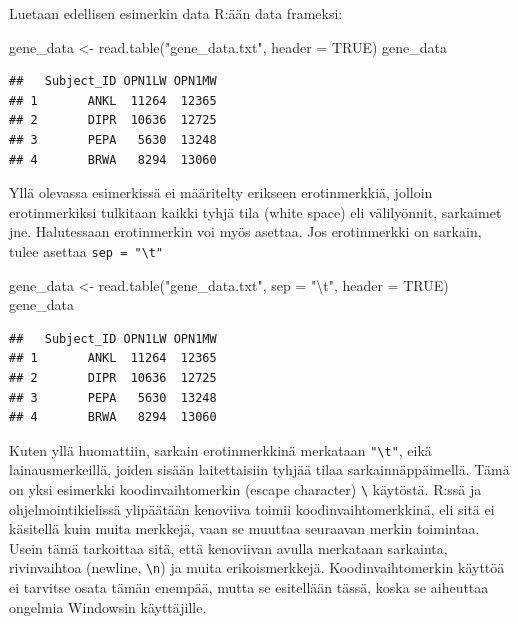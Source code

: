 \documentclass[
]{book}
\newenvironment{Shaded}{\begin{snugshade}}{\end{snugshade}}
\newcommand{\AttributeTok}[1]{\textcolor[rgb]{0.77,0.63,0.00}{#1}}
\newcommand{\ConstantTok}[1]{\textcolor[rgb]{0.00,0.00,0.00}{#1}}
\newcommand{\FunctionTok}[1]{\textcolor[rgb]{0.00,0.00,0.00}{#1}}
\newcommand{\NormalTok}[1]{#1}
\newcommand{\OtherTok}[1]{\textcolor[rgb]{0.56,0.35,0.01}{#1}}
\newcommand{\SpecialCharTok}[1]{\textcolor[rgb]{0.00,0.00,0.00}{#1}}
\newcommand{\StringTok}[1]{\textcolor[rgb]{0.31,0.60,0.02}{#1}}
\begin{document}
Luetaan edellisen esimerkin data R:ään data frameksi:

\begin{Shaded}
\begin{Highlighting}[]
\NormalTok{gene\_data }\OtherTok{\textless{}{-}} \FunctionTok{read.table}\NormalTok{(}\StringTok{"gene\_data.txt"}\NormalTok{, }\AttributeTok{header =} \ConstantTok{TRUE}\NormalTok{)}
\NormalTok{gene\_data}
\end{Highlighting}
\end{Shaded}

\begin{verbatim}
##   Subject_ID OPN1LW OPN1MW
## 1       ANKL  11264  12365
## 2       DIPR  10636  12725
## 3       PEPA   5630  13248
## 4       BRWA   8294  13060
\end{verbatim}

Yllä olevassa esimerkissä ei määritelty erikseen erotinmerkkiä, jolloin erotinmerkiksi tulkitaan kaikki tyhjä tila (white space) eli välilyönnit, sarkaimet jne. Halutessaan erotinmerkin voi myös asettaa. Jos erotinmerkki on sarkain, tulee asettaa \texttt{sep\ =\ "\textbackslash{}t"}

\begin{Shaded}
\begin{Highlighting}[]
\NormalTok{gene\_data }\OtherTok{\textless{}{-}} \FunctionTok{read.table}\NormalTok{(}\StringTok{"gene\_data.txt"}\NormalTok{, }\AttributeTok{sep =} \StringTok{"}\SpecialCharTok{\textbackslash{}t}\StringTok{"}\NormalTok{, }\AttributeTok{header =} \ConstantTok{TRUE}\NormalTok{)}
\NormalTok{gene\_data}
\end{Highlighting}
\end{Shaded}

\begin{verbatim}
##   Subject_ID OPN1LW OPN1MW
## 1       ANKL  11264  12365
## 2       DIPR  10636  12725
## 3       PEPA   5630  13248
## 4       BRWA   8294  13060
\end{verbatim}

Kuten yllä huomattiin, sarkain erotinmerkkinä merkataan \texttt{"\textbackslash{}t"}, eikä lainausmerkeillä, joiden sisään laitettaisiin tyhjää tilaa sarkainnäppäimellä. Tämä on yksi esimerkki koodinvaihtomerkin (escape character) \texttt{\textbackslash{}} käytöstä. R:ssä ja ohjelmointikielissä ylipäätään kenoviiva toimii koodinvaihtomerkkinä, eli sitä ei käsitellä kuin muita merkkejä, vaan se muuttaa seuraavan merkin toimintaa. Usein tämä tarkoittaa sitä, että kenoviivan avulla merkataan sarkainta, rivinvaihtoa (newline, \texttt{\textbackslash{}n}) ja muita erikoismerkkejä. Koodinvaihtomerkin käyttöä ei tarvitse osata tämän enempää, mutta se esitellään tässä, koska se aiheuttaa ongelmia Windowsin käyttäjille.
\end{document}
